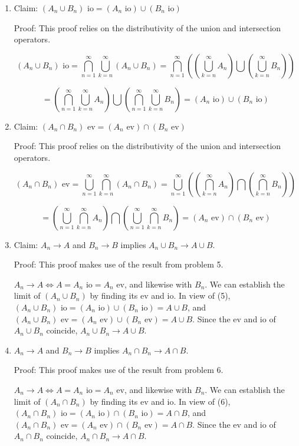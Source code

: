 \documentclass[12pt]{article}
\begin{document}
\begin{enumerate}
\item Claim: $(A_n \cup B_n)\mbox{ io} = (A_n \mbox{ io})\cup (B_n\mbox{ io})$

Proof: This proof relies on the distributivity of the union and intersection operators. 

$$(A_n \cup B_n)\mbox{ io} = \bigcap^\infty_{n=1}\bigcup^\infty_{k=n}(A_n \cup B_n) = \bigcap^\infty_{n=1} \left( \left( \bigcup^\infty_{k=n}A_n \right) \bigcup \left( \bigcup^\infty_{k=n}B_n \right) \right)$$

$$ = \left( \bigcap^\infty_{n=1}\bigcup^\infty_{k=n}A_n \right) \bigcup \left( \bigcap^\infty_{n=1} \bigcup^\infty_{k=n}B_n \right) = (A_n \mbox{ io})\cup (B_n\mbox{ io}) $$

\item Claim: $(A_n \cap B_n)\mbox{ ev} = (A_n \mbox{ ev})\cap (B_n\mbox{ ev})$

Proof: This proof relies on the distributivity of the union and intersection operators. 

$$(A_n \cap B_n)\mbox{ ev} = \bigcup^\infty_{n=1}\bigcap^\infty_{k=n}(A_n \cap B_n) = \bigcup^\infty_{n=1} \left( \left( \bigcap^\infty_{k=n}A_n \right) \bigcap \left( \bigcap^\infty_{k=n}B_n \right) \right)$$

$$ = \left( \bigcup^\infty_{n=1}\bigcap^\infty_{k=n}A_n \right) \bigcap \left( \bigcup^\infty_{n=1} \bigcap^\infty_{k=n}B_n \right) = (A_n \mbox{ ev})\cap (B_n\mbox{ ev}) $$

\item Claim: $A_n \to A$ and $B_n \to B$ implies $A_n \cup B_n \to A \cup B$.

Proof: This proof makes use of the result from problem 5.

$A_n \to A \Leftrightarrow A = A_n \mbox{ io} = A_n \mbox{ ev}$, and likewise with $B_n$. We can establish the limit of $(A_n \cup B_n)$ by finding its ev and io. In view of (5), $(A_n \cup B_n)\mbox{ io} = (A_n\mbox{ io}) \cup (B_n\mbox{ io})=A \cup B$, and $(A_n \cup B_n)\mbox{ ev} = (A_n\mbox{ ev}) \cup (B_n\mbox{ ev})=A \cup B$. Since the ev and io of $A_n \cup B_n$ coincide, $A_n \cup B_n \to A \cup B$.

\item $A_n \to A$ and $B_n \to B$ implies $A_n \cap B_n \to A \cap B$.

Proof: This proof makes use of the result from problem 6.

$A_n \to A \Leftrightarrow A = A_n \mbox{ io} = A_n \mbox{ ev}$, and likewise with $B_n$. We can establish the limit of $(A_n \cap B_n)$ by finding its ev and io. In view of (6), $(A_n \cap B_n)\mbox{ io} = (A_n\mbox{ io}) \cap (B_n\mbox{ io})=A \cap B$, and $(A_n \cap B_n)\mbox{ ev} = (A_n\mbox{ ev}) \cap (B_n\mbox{ ev})=A \cap B$. Since the ev and io of $A_n \cap B_n$ coincide, $A_n \cap B_n \to A \cap B$.


\end{enumerate}
\end{document}
